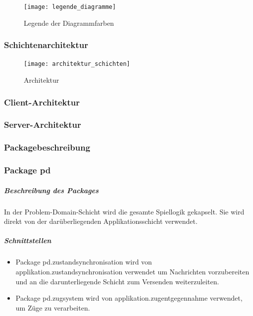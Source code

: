 \documentclass[a4paper,12pt,halfparskip,DIV12]{scrartcl}
\begin{document}
\begin{figure}
	\centering
	\texttt{[image: legende\_diagramme]}
	\caption{Legende der Diagrammfarben}
	\label{fig:legende_diagramme}
\end{figure}

\subsubsection{Schichtenarchitektur} %
\label{sub:schichtenarchitektur}

\begin{figure}
	\centering
	\texttt{[image: architektur\_schichten]}
	\caption{Architektur}
	\label{fig:architektur_schichten}
\end{figure}

\subsubsection{Client-Architektur}

\subsubsection{Server-Architektur}

\subsubsection{Packagebeschreibung} %
\label{sub:pagebeschreibung}

\subsubsection{Package pd} %
\label{ssub:package_pd}
\subparagraph{Beschreibung des Packages} %
\label{ssub:beschreibung_des_packages}
In der Problem-Domain-Schicht wird die gesamte Spiellogik gekapselt. Sie wird direkt von der darüberliegenden Applikationsschicht verwendet.
\subparagraph{Schnittstellen} %
\label{ssub:schnittstellen}
\begin{itemize}
	\item Package pd.zustandsynchronisation wird von applikation.zustandsynchronisation verwendet um Nachrichten vorzubereiten und an die darunterliegende Schicht zum Versenden weiterzuleiten.
	\item Package pd.zugsystem wird von applikation.zugentgegennahme verwendet, um Züge zu verarbeiten.
\end{itemize}
\end{document}
